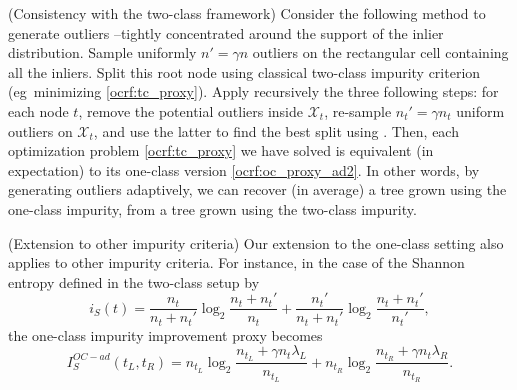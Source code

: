 \begin{remark}({Consistency with the two-class framework})
    Consider the following method to generate outliers --tightly concentrated
    around the support of the inlier distribution. 
    Sample uniformly $n'= \gamma n$ outliers on the rectangular cell containing
    all the inliers. Split this root node using classical two-class impurity
    criterion (\acs{eg}~minimizing \cref{ocrf:tc_proxy}). Apply recursively the
    three following steps: for each node $t$, remove the potential outliers
    inside  $\mathcal{X}_t$, re-sample $n_t'=\gamma n_t$ uniform outliers on
    $\mathcal{X}_t$, and use the latter to find the best split using
    . 
    Then, each optimization problem \cref{ocrf:tc_proxy} we have solved is
    equivalent (in expectation) to its one-class version
    \cref{ocrf:oc_proxy_ad2}. In other words, by generating outliers
    adaptively, we can recover (in average) a tree grown using the one-class
    impurity, from a tree grown using the two-class impurity.
\end{remark}

\begin{remark}({Extension to other impurity criteria})
    Our extension to the one-class setting also applies to other impurity
    criteria. For instance, in the case of the Shannon entropy defined in the
    two-class setup by
    \begin{dmath*}
        i_S(t) = \frac{n_t}{n_t + n_t'} \log_2 \frac{n_t + n_t'}{n_t} +
        \frac{n_t'}{n_t + n_t'} \log_2 \frac{n_t + n_t'}{n_t'},
    \end{dmath*}
    the one-class impurity improvement proxy becomes
    \begin{dmath*}
        I_S^{OC-ad}(t_L, t_R) = n_{t_L} \log_2 \frac{n_{t_L} + \gamma n_t
        \lambda_L}{n_{t_L}} + n_{t_R} \log_2 \frac{n_{t_R} + \gamma n_t
        \lambda_R}{n_{t_R}}.
    \end{dmath*}
\end{remark}
%
%
